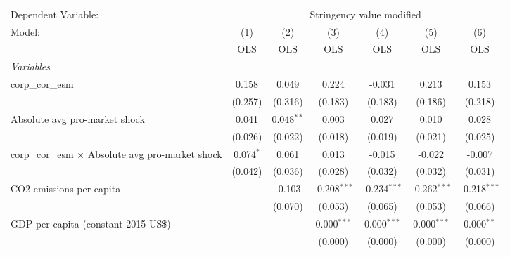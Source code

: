 
\begingroup
\centering
\begin{tabular}{lcccccc}
   \toprule
   Dependent Variable: & \multicolumn{6}{c}{Stringency value modified}\\
   Model:                                                   & (1)         & (2)          & (3)            & (4)            & (5)            & (6)\\  
                                                            &  OLS        & OLS          & OLS            & OLS            & OLS            & OLS\\  
   \midrule
   \emph{Variables}\\
   corp\_cor\_esm                                           & 0.158       & 0.049        & 0.224          & -0.031         & 0.213          & 0.153\\   
                                                            & (0.257)     & (0.316)      & (0.183)        & (0.183)        & (0.186)        & (0.218)\\   
   Absolute avg pro-market shock                            & 0.041       & 0.048$^{**}$ & 0.003          & 0.027          & 0.010          & 0.028\\   
                                                            & (0.026)     & (0.022)      & (0.018)        & (0.019)        & (0.021)        & (0.025)\\   
   corp\_cor\_esm $\times$ Absolute avg pro-market shock    & 0.074$^{*}$ & 0.061        & 0.013          & -0.015         & -0.022         & -0.007\\   
                                                            & (0.042)     & (0.036)      & (0.028)        & (0.032)        & (0.032)        & (0.031)\\   
   CO2 emissions per capita                                 &             & -0.103       & -0.208$^{***}$ & -0.234$^{***}$ & -0.262$^{***}$ & -0.218$^{***}$\\   
                                                            &             & (0.070)      & (0.053)        & (0.065)        & (0.053)        & (0.066)\\   
   GDP per capita (constant 2015 US\$)                      &             &              & 0.000$^{***}$  & 0.000$^{***}$  & 0.000$^{***}$  & 0.000$^{**}$\\   
                                                            &             &              & (0.000)        & (0.000)        & (0.000)        & (0.000)\\   

\end{tabular}
